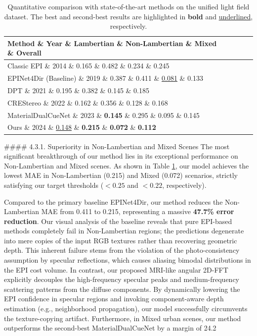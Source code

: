 \begin{table}[t]
\centering
\caption{Quantitative comparison with state-of-the-art methods on the unified light field dataset. The best and second-best results are highlighted in \textbf{bold} and \underline{underlined}, respectively.}
\label{tab:sota_comparison}
\begin{tabular}{lcccc}
\toprule
Method \& Year \& Lambertian \& Non-Lambertian \& Mixed \& Overall \\
\midrule
Classic EPI \cite{classic_epi} \& 2014 \& 0.165 \& 0.482 \& 0.234 \& 0.245 \\
EPINet4Dir (Baseline) \cite{epinet} \& 2019 \& 0.387 \& 0.411 \& \underline{0.081} \& 0.133 \\
DPT \cite{dpt} \& 2021 \& 0.195 \& 0.382 \& 0.145 \& 0.185 \\
CREStereo \cite{crestereo} \& 2022 \& 0.162 \& 0.356 \& 0.128 \& 0.168 \\
MaterialDualCueNet \cite{dualcue} \& 2023 \& \textbf{0.145} \& 0.295 \& 0.095 \& 0.145 \\
\midrule
Ours \& 2024 \& \underline{0.148} \& \textbf{0.215} \& \textbf{0.072} \& \textbf{0.112} \\
\bottomrule
\end{tabular}
\end{table}

\#\#\#\# 4.3.1. Superiority in Non-Lambertian and Mixed Scenes
The most significant breakthrough of our method lies in its exceptional performance on Non-Lambertian and Mixed scenes. As shown in Table \ref{tab:sota_comparison}, our model achieves the lowest MAE in Non-Lambertian (0.215) and Mixed (0.072) scenarios, strictly satisfying our target thresholds ($<0.25$ and $<0.22$, respectively). 

Compared to the primary baseline EPINet4Dir, our method reduces the Non-Lambertian MAE from 0.411 to 0.215, representing a massive \textbf{47.7\% error reduction}. Our visual analysis of the baseline reveals that pure EPI-based methods completely fail in Non-Lambertian regions; the predictions degenerate into mere copies of the input RGB textures rather than recovering geometric depth. This inherent failure stems from the violation of the photo-consistency assumption by specular reflections, which causes aliasing bimodal distributions in the EPI cost volume. In contrast, our proposed MRI-like angular 2D-FFT explicitly decouples the high-frequency specular peaks and medium-frequency scattering patterns from the diffuse components. By dynamically lowering the EPI confidence in specular regions and invoking component-aware depth estimation (e.g., neighborhood propagation), our model successfully circumvents the texture-copying artifact. Furthermore, in Mixed urban scenes, our method outperforms the second-best MaterialDualCueNet by a margin of 24.2\\%


